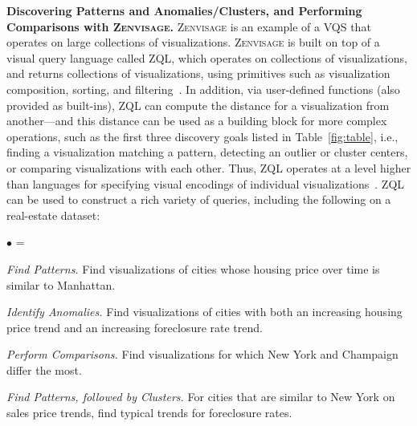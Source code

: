 \documentclass[11pt]{article}
\newcommand{\squishlist}{
   \begin{list}{$\bullet$}
    { \setlength{\itemsep}{0pt}
      \setlength{\parsep}{2pt}
      \setlength{\topsep}{0pt}
      \setlength{\partopsep}{0pt}
      \leftmargin=25pt
\rightmargin=0pt
\labelsep=5pt
\labelwidth=10pt
\itemindent=0pt
\listparindent=0pt
\itemsep=\parsep
    }
}
\newcommand{\squishend}{\end{list}}
\newcommand{\stitle}[1]{\par\noindent\textbf{#1}}
\newcommand{\zv}{\textsc{Zenvisage}\xspace}
\begin{document}
\stitle{Discovering Patterns and Anomalies/Clusters, and Performing Comparisons with \zv.}
\zv is an example of a VQS that operates on 
large collections of visualizations.
\zv is built on top of a visual query language
called ZQL, which operates on collections of visualizations, and returns
collections of visualizations,
using primitives such as visualization composition,
sorting, and filtering~\cite{Siddiqui2016}. 
In addition, via user-defined functions (also provided as built-ins),
ZQL can compute the distance for a visualization from another---and this
distance can be used as a building block for more complex
operations, such as the first three discovery goals listed
in Table~\ref{fig:table}, i.e., finding a visualization
matching a pattern, detecting an outlier or cluster centers,
or comparing visualizations with each other.
Thus, ZQL operates at a level higher than
languages for specifying visual encodings of
individual visualizations~\cite{Stolte2002,Wilkinson2005}.
ZQL can be used to construct a rich variety of queries,
including the following on a real-estate dataset:
\squishlist
	\item {\em Find Patterns.} Find visualizations of cities whose housing price over time is similar to Manhattan. 
	\item {\em Identify Anomalies.} Find visualizations of cities with both an increasing housing price trend and an increasing foreclosure rate trend.
	\item {\em Perform Comparisons.} Find visualizations for which New York and Champaign differ the most.
	\item {\em Find Patterns, followed by Clusters.} For cities that are similar
	to New York on sales price trends, find typical trends for foreclosure rates.
\squishend
\end{document}
